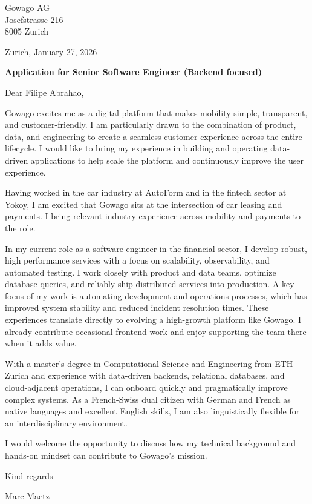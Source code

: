 \documentclass[11pt,a4paper]{article}
\begin{document}
Gowago AG\\
Josefstrasse 216\\
8005 Zurich

\vspace{12pt}

Zurich, January 27, 2026

\vspace{12pt}

\textbf{Application for Senior Software Engineer (Backend focused)}

\vspace{6pt}

Dear Filipe Abrahao,

Gowago excites me as a digital platform that makes mobility simple, transparent, and customer-friendly. I am particularly drawn to the combination of product, data, and engineering to create a seamless customer experience across the entire lifecycle. I would like to bring my experience in building and operating data-driven applications to help scale the platform and continuously improve the user experience.

Having worked in the car industry at AutoForm and in the fintech sector at Yokoy, I am excited that Gowago sits at the intersection of car leasing and payments. I bring relevant industry experience across mobility and payments to the role.

In my current role as a software engineer in the financial sector, I develop robust, high performance services with a focus on scalability, observability, and automated testing. I work closely with product and data teams, optimize database queries, and reliably ship distributed services into production. A key focus of my work is automating development and operations processes, which has improved system stability and reduced incident resolution times. These experiences translate directly to evolving a high-growth platform like Gowago. I already contribute occasional frontend work and enjoy supporting the team there when it adds value.

With a master's degree in Computational Science and Engineering from ETH Zurich and experience with data-driven backends, relational databases, and cloud-adjacent operations, I can onboard quickly and pragmatically improve complex systems. As a French-Swiss dual citizen with German and French as native languages and excellent English skills, I am also linguistically flexible for an interdisciplinary environment.

I would welcome the opportunity to discuss how my technical background and hands-on mindset can contribute to Gowago's mission.

\vspace{12pt}

Kind regards

\vspace{18pt}

Marc Maetz
\end{document}
